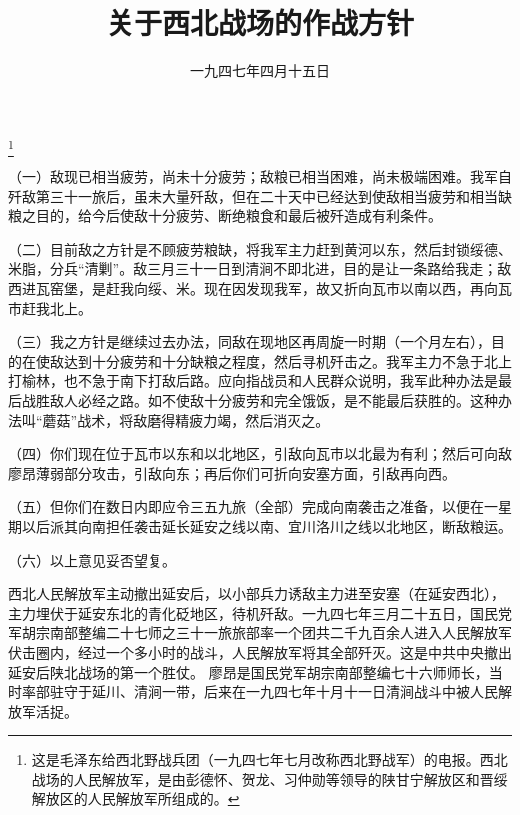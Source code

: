 
\title{关于西北战场的作战方针}
\date{一九四七年四月十五日}
\thanks{这是毛泽东给西北野战兵团（一九四七年七月改称西北野战军）的电报。西北战场的人民解放军，是由彭德怀、贺龙、习仲勋等领导的陕甘宁解放区和晋绥解放区的人民解放军所组成的。}
\maketitle


（一）敌现已相当疲劳，尚未十分疲劳；敌粮已相当困难，尚未极端困难。我军自歼敌第三十一旅后，虽未大量歼敌，但在二十天中已经达到使敌相当疲劳和相当缺粮之目的，给今后使敌十分疲劳、断绝粮食和最后被歼造成有利条件。

（二）目前敌之方针是不顾疲劳粮缺，将我军主力赶到黄河以东，然后封锁绥德、米脂，分兵“清剿”。敌三月三十一日到清涧不即北进，目的是让一条路给我走；敌西进瓦窑堡，是赶我向绥、米。现在因发现我军，故又折向瓦市以南以西，再向瓦市赶我北上。

（三）我之方针是继续过去办法，同敌在现地区再周旋一时期（一个月左右），目的在使敌达到十分疲劳和十分缺粮之程度，然后寻机歼击之。我军主力不急于北上打榆林，也不急于南下打敌后路。应向指战员和人民群众说明，我军此种办法是最后战胜敌人必经之路。如不使敌十分疲劳和完全饿饭，是不能最后获胜的。这种办法叫“蘑菇”战术，将敌磨得精疲力竭，然后消灭之。

（四）你们现在位于瓦市以东和以北地区，引敌向瓦市以北最为有利；然后可向敌廖昂薄弱部分攻击，引敌向东；再后你们可折向安塞方面，引敌再向西。

（五）但你们在数日内即应令三五九旅（全部）完成向南袭击之准备，以便在一星期以后派其向南担任袭击延长延安之线以南、宜川洛川之线以北地区，断敌粮运。

（六）以上意见妥否望复。


\begin{maonote}
西北人民解放军主动撤出延安后，以小部兵力诱敌主力进至安塞（在延安西北），主力埋伏于延安东北的青化砭地区，待机歼敌。一九四七年三月二十五日，国民党军胡宗南部整编二十七师之三十一旅旅部率一个团共二千九百余人进入人民解放军伏击圈内，经过一个多小时的战斗，人民解放军将其全部歼灭。这是中共中央撤出延安后陕北战场的第一个胜仗。
廖昂是国民党军胡宗南部整编七十六师师长，当时率部驻守于延川、清涧一带，后来在一九四七年十月十一日清涧战斗中被人民解放军活捉。
\end{maonote}
